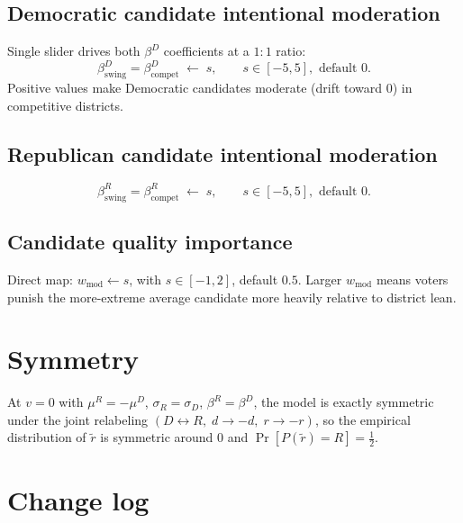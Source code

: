 \documentclass[11pt]{article}
\begin{document}
\subsection*{Democratic candidate intentional moderation}
Single slider drives both $\beta^D$ coefficients at a $1{:}1$ ratio:
\[
  \beta^D_{\text{swing}} = \beta^D_{\text{compet}} \;\leftarrow\; s,
  \qquad s \in [-5, 5], \text{ default } 0.
\]
Positive values make Democratic candidates moderate (drift toward $0$) in
competitive districts.

\subsection*{Republican candidate intentional moderation}
\[
  \beta^R_{\text{swing}} = \beta^R_{\text{compet}} \;\leftarrow\; s,
  \qquad s \in [-5, 5], \text{ default } 0.
\]

\subsection*{Candidate quality importance}
Direct map: $w_{\text{mod}} \leftarrow s$, with $s \in [-1, 2]$, default
$0.5$. Larger $w_{\text{mod}}$ means voters punish the more-extreme average
candidate more heavily relative to district lean.

\section{Symmetry}

At $v = 0$ with $\mu^R = -\mu^D$, $\sigma_R = \sigma_D$, $\beta^R = \beta^D$,
the model is exactly symmetric under the joint relabeling
$(D \leftrightarrow R,\; d \to -d,\; r \to -r)$, so the empirical distribution
of $\tilde{r}$ is symmetric around $0$ and $\Pr[P(\tilde{r}) = R] = \tfrac{1}{2}$.

\section{Change log}
\end{document}
